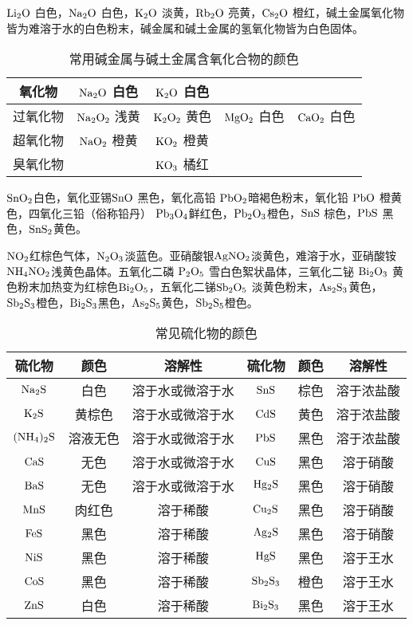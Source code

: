 \documentclass[
  10pt,
  twoside,
  openany,
  b5paper, %
  colorscheme = basic, %
  xits = false,
]{qyxf-book}
\begin{document}
$\ce{Li2O}$ 白色，$\ce{Na2O}$ 白色，$\ce{K2O}$ 淡黄，$\ce{Rb2O}$ 亮黄，$\ce{Cs2O}$ 橙红，碱土金属氧化物皆为难溶于水的白色粉末，碱金属和碱土金属的氢氧化物皆为白色固体。

\begin{table}[htbp]
	\centering
	\caption{常用碱金属与碱土金属含氧化合物的颜色}
	\begin{tabular}{|c|c|c|c|c|}
		\hline
		氧化物 & $\ce{Na2O}$ 白色 & $\ce{K2O}$ 白色& & \\ \hline
		过氧化物 & $\ce{Na2O2}$ 浅黄 & $\ce{K2O2}$ 黄色 &  $\ce{MgO2}$ 白色 & $\ce{CaO2}$ 白色 \\ \hline
		超氧化物 & $\ce{NaO2}$ 橙黄 & $\ce{KO2}$ 橙黄 & &\\ \hline
		臭氧化物 & & $\ce{KO3}$ 橘红 & & \\ \hline
	\end{tabular}
\end{table}

$\ce{SnO2}$白色，氧化亚锡$ \ce{SnO}$ 黑色，氧化高铅 $\ce{PbO2}$暗褐色粉末，氧化铅 $\ce{PbO}$ 橙黄色，四氧化三铅（俗称铅丹）
$\ce{Pb3O4}$鲜红色，$\ce{Pb2O3}$橙色，$\ce{SnS}$ 棕色，$\ce{PbS}$ 黑色，$\ce{SnS2}$黄色。

$\ce{NO2}$红棕色气体，$\ce{N2O3}$淡蓝色。亚硝酸银$\ce{AgNO2}$淡黄色，难溶于水，亚硝酸铵 $\ce{NH4NO2}$浅黄色晶体。五氧化二磷 $\ce{P2O5}$ 雪白色絮状晶体，三氧化二铋 $\ce{Bi2O3}$ 黄色粉末加热变为红棕色$\ce{Bi2O5}$，五氧化二锑$\ce{Sb2O5}$
淡黄色粉末，$\ce{As2S3}$黄色，$\ce{Sb2S3}$橙色，$\ce{Bi2S3}$黑色，$\ce{As2S5}$黄色，$\ce{Sb2S5}$橙色。

\begin{table}[htbp]
	\centering
	\caption{常见硫化物的颜色}
	\begin{tabular}{|c|c|c||c|c|c|}
		\hline
		硫化物 & 颜色 & 溶解性 & 硫化物 & 颜色 & 溶解性  \\ \hline
		$\ce{Na2S}$ & 白色 & 溶于水或微溶于水 & $\ce{SnS}$ & 棕色 & 溶于浓盐酸  \\ \hline
		$\ce{K2S}$ & 黄棕色 & 溶于水或微溶于水 & $\ce{CdS}$ & 黄色 & 溶于浓盐酸  \\ \hline
		$\ce{(NH4)2S}$ & 溶液无色 & 溶于水或微溶于水 & $\ce{PbS}$ & 黑色 & 溶于浓盐酸  \\ \hline
		$\ce{CaS}$ & 无色 & 溶于水或微溶于水 & $\ce{CuS}$ & 黑色 & 溶于硝酸  \\ \hline
		$\ce{BaS}$ & 无色 & 溶于水或微溶于水 & $\ce{Hg2S}$ & 黑色 & 溶于硝酸  \\ \hline
		$\ce{MnS}$ & 肉红色 & 溶于稀酸 & $\ce{Cu2S}$ & 黑色 & 溶于硝酸  \\ \hline
		$\ce{FeS}$ & 黑色 & 溶于稀酸 & $\ce{Ag2S}$ & 黑色 & 溶于硝酸  \\ \hline
		$\ce{NiS}$ & 黑色 & 溶于稀酸 & $\ce{HgS}$ & 黑色 & 溶于王水  \\ \hline
		$\ce{CoS}$ & 黑色 & 溶于稀酸 & $\ce{Sb2S3}$ & 橙色 & 溶于王水  \\ \hline
		$\ce{ZnS}$ & 白色 & 溶于稀酸 & $\ce{Bi2S3}$ & 黑色 & 溶于王水  \\ \hline
	\end{tabular}
\end{table}
\end{document}
